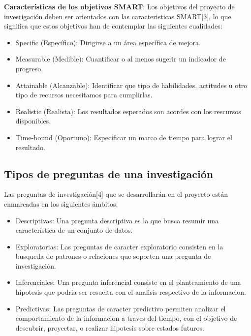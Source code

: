    \textbf{Características de los objetivos SMART}: Los objetivos del proyecto de investigación deben ser orientados con las caracteristicas SMART[3], lo que significa que estos objetivos han de contemplar las siguientes cualidades:%
   \begin{itemize}
     \item Specific  (Específico): Dirigirse a un área específica de mejora.%
     \item Measurable (Medible): Cuantificar o al menos sugerir un indicador de progreso.%
     \item Attainable (Alcanzable): Identificar que tipo de habilidades, actitudes u otro tipo de recursos necesitamos para cumplirlas.%
     \item Realistic (Realista): Los resultados esperados son acordes con los rescursos disponibles.%
     \item Time-bound (Oportuno): Especificar un marco de tiempo para lograr el resultado.%
	\end{itemize}

  \subsection{Tipos de preguntas de una investigación}
  Las preguntas de investigación[4] que se desarrollarán en el proyecto están enmarcadas en los siguientes ámbitos:
  \begin{itemize}
   \item Descriptivas: Una pregunta descriptiva es la que busca resumir una característica de un conjunto de datos.
   \item Exploratorias: Las preguntas de caracter exploratorio consisten en la busqueda de patrones o relaciones que soporten una pregunta de investigación.
   \item Inferenciales: Una pregunta inferencial consiste en el planteamiento de una hipotesis que podria ser resuelta con el analisis respectivo de la informacion.
   \item Predictivas: Las preguntas de caracter predictivo permiten analizar el comportamiento de la informacion a traves del tiempo, con el objetivo de descubrir, proyectar, o realizar hipotesis sobre estados futuros.
  \end{itemize}
  
